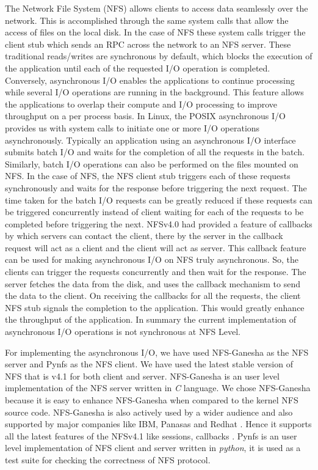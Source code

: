The Network File System (NFS) allows clients to access data seamlessly over the network. This is accomplished through the same system calls that allow the access of files on the local disk. In the case of NFS these system calls trigger the client stub which sends an RPC across the network to an NFS server. These traditional reads/writes are synchronous by default, which blocks the execution of the application until each of the requested I/O operation is completed. Conversely, asynchronous I/O enables the applications to continue processing while several I/O operations are running in the background. This feature allows the applications to overlap their compute and I/O processing to improve throughput on a per process basis. In Linux, the POSIX asynchronous I/O \cite{aio} provides us with system calls to initiate one or more I/O operations asynchronously. Typically an application using an asynchronous I/O interface submits batch I/O and waits for the completion of all the requests in the batch. Similarly, batch I/O operations can also be performed on the files mounted on NFS. In the case of NFS, the NFS client stub triggers each of these requests synchronously and waits for the response before triggering the next request. The time taken for the batch I/O requests can be greatly reduced if these requests can be triggered concurrently instead of client waiting for each of the requests to be completed before triggering the next. NFSv4.0 had provided a feature of callbacks by which servers can contact the client, there by the server in the callback request will act as a client and the client will act as server. This callback feature can be used for making  asynchronous I/O on NFS truly asynchronous. So, the clients can trigger the requests concurrently and then wait for the response. The server fetches the data from the disk, and uses the callback mechanism to send the data to the client. On receiving the callbacks for all the requests, the client NFS stub signals the completion to the  application. This would greatly enhance the throughput of the application. In summary the current implementation of asynchronous I/O operations is not synchronous at NFS Level.

For implementing the asynchronous I/O, we have used NFS-Ganesha \cite{ganesha} as the NFS server and Pynfs \cite{pynfs} as the NFS client. We have used the latest stable version of NFS that is v4.1 for both client and server. NFS-Ganesha is an user level implementation of the NFS server written in \textit{C} language. We chose NFS-Ganesha because it is easy to enhance NFS-Ganesha when compared to the kernel NFS source code. NFS-Ganesha is also actively used by a wider audience and also supported by major companies like IBM, Panasas and Redhat \cite{NFSGanesha}. Hence it supports all the latest features of the NFSv4.1 like sessions, callbacks \cite{NFSv41rfc}. Pynfs is an user level implementation of NFS client and server written in \textit{python}, it is used as a test suite for checking the correctness of NFS protocol.

